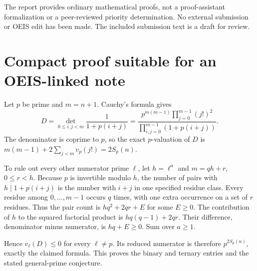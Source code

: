 \documentclass[11pt,a4paper]{article}
\theoremstyle{definition}
\theoremstyle{remark}
\begin{document}
The report provides ordinary mathematical proofs, not a proof-assistant
formalization or a peer-reviewed priority determination. No external
submission or OEIS edit has been made. The included submission text is a
draft for review.

\appendix
\section{Compact proof suitable for an OEIS-linked note}
\label{sec:compact}

Let $p$ be prime and $m=n+1$. Cauchy's formula gives
\[
 D=\det_{0\le i,j<m}\frac1{1+p(i+j)}
 =\frac{p^{m(m-1)}\prod_{j=0}^{m-1}(j!)^2}
 {\prod_{i,j=0}^{m-1}(1+p(i+j))}.
\]
The denominator is coprime to $p$, so the exact $p$-valuation of $D$ is
$m(m-1)+2\sum_{j<m}v_p(j!)=2S_p(n)$.

To rule out every other numerator prime $\ell$, let $h=\ell^a$ and
$m=qh+r$, $0\le r<h$. Because $p$ is invertible modulo $h$, the number
of pairs with $h\mid1+p(i+j)$ is the number with $i+j$ in one specified
residue class. Every residue among $0,\ldots,m-1$ occurs $q$ times, with
one extra occurrence on a set of $r$ residues. Thus the pair count is
$hq^2+2qr+E$ for some $E\ge0$. The contribution of $h$ to the squared
factorial product is $hq(q-1)+2qr$. Their difference, denominator minus
numerator, is $hq+E\ge0$. Sum over $a\ge1$.

Hence $v_\ell(D)\le0$ for every $\ell\ne p$. Its reduced numerator is
therefore $p^{2S_p(n)}$, exactly the claimed formula. This proves the
binary and ternary entries and the stated general-prime conjecture.
\end{document}

